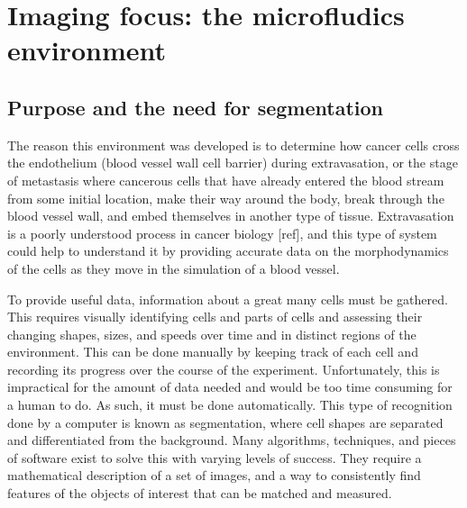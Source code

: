 
\chapter{Imaging focus: the microfludics environment}

\ifpdf
    \graphicspath{{Chapter2/Figs/Raster/}{Chapter2/Figs/PDF/}{Chapter2/Figs/}}
\else
    \graphicspath{{Chapter2/Figs/Vector/}{Chapter2/Figs/}}
\fi

\section{Purpose and the need for segmentation}

The reason this environment was developed is to determine how cancer cells cross the endothelium (blood vessel wall cell barrier) during extravasation, or the stage of metastasis where cancerous cells that have already entered the blood stream from some initial location, make their way around the body, break through the blood vessel wall, and embed themselves in another type of tissue. Extravasation is a poorly understood process in cancer biology [ref], and this type of system could help to understand it by providing accurate data on the morphodynamics of the cells as they move in the simulation of a blood vessel.

To provide useful data, information about a great many cells must be gathered. This requires visually identifying cells and parts of cells and assessing their changing shapes, sizes, and speeds over time and in distinct regions of the environment. This can be done manually by keeping track of each cell and recording its progress over the course of the experiment. Unfortunately, this is impractical for the amount of data needed and would be too time consuming for a human to do. As such, it must be done automatically. This type of recognition done by a computer is known as segmentation, where cell shapes are separated and differentiated from the background. Many algorithms, techniques, and pieces of software exist to solve this with varying levels of success. They require a mathematical description of a set of images, and a way to consistently find features of the objects of interest that can be matched and measured.

